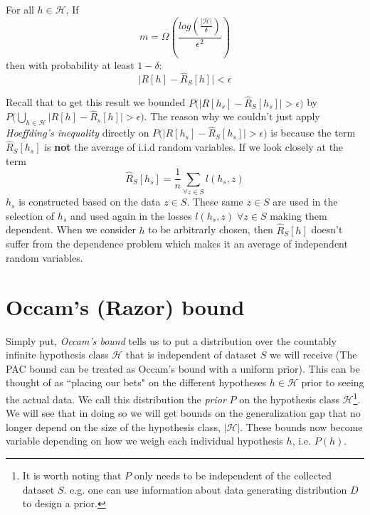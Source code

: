 \documentclass{article}
\begin{document}

\begin{thm} For all $h \in \mathcal{H}$, If
\[
	m=\Omega\left(\frac{log(\frac{|\mathcal{H}|}{\delta})}{\epsilon^2}\right)
\]
then with probability at least $1-\delta$:
\[
\big|R[h]-\hat{R}_S[h] \big|<\epsilon
\]
\end{thm}




Recall that to get this result we bounded $P \big( \big|R[h_s]-\hat{R}_S[h_s] \big|>\epsilon \big)$ by $P \big( \bigcup_{h \in \mathcal{H}} \big|R[h]-\hat{R}_s[h] \big|>\epsilon \big)$. 
The reason why we couldn't just apply \textit{Hoeffding's inequality} directly on $P \big( \big|R[h_s]-\hat{R}_S[h_s] \big|>\epsilon \big)$ is because the term $\hat{R}_S[h_s]$ is \textbf{not} the average of i.i.d random variables. If we look closely at the term  $$\hat{R}_S[h_s] = \frac{1}{n} \sum_{\forall z \in S} l(h_s,z) $$
$h_s$ is constructed based on the data $z \in S$. These same $z \in S$ are used in the selection of $h_s$ and used again in the losses $l(h_s,z) \; \forall z \in S$ making them dependent. When we consider $h$ to be arbitrarly chosen, then $\hat{R}_S[h]$ doesn't suffer from the dependence problem which makes it an average of independent random variables.


\section{Occam's (Razor) bound } 

Simply put, \emph{Occam's bound} tells us to put a distribution over the countably infinite hypothesis class $\mathcal{H}$ that is independent of dataset $S$ we will receive (The PAC bound can be treated as Occam's bound with a uniform prior).
This can be thought of as ``placing our bets" on the different hypotheses $h \in \mathcal{H}$ prior to seeing the actual data.
We call this distribution the \textit{prior} $P$ on the hypothesis class $\mathcal{H}$\footnote{It is worth noting that $P$ only needs to be independent of the collected dataset $S$. e.g. one can use information about data generating distribution $D$ to design a prior.}. We will see that in doing so we will get bounds on the generalization gap that no longer depend on the size of the hypothesis class, $|\mathcal{H}|$. These bounds now become variable depending on how we weigh each individual hypothesis $h$, i.e. $P(h)$.
\end{document}
